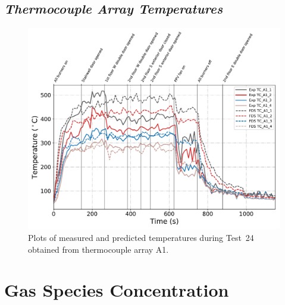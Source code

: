 \clearpage
\subsection*{\textit{Thermocouple Array Temperatures}}

\begin{figure}[!h]
	\centering
	\includegraphics[width=\columnwidth]{Figures/Plots/Validation/Temperature/Test_24_TC_A1_upper}
	\caption[Plots of measured and predicted thermocouple array temperatures during Test~24.]{Plots of measured and predicted temperatures during Test~24 obtained from thermocouple array A1.}
	\label{fig:TCarray_data}
\end{figure}

\clearpage
\section{Gas Species Concentration}
